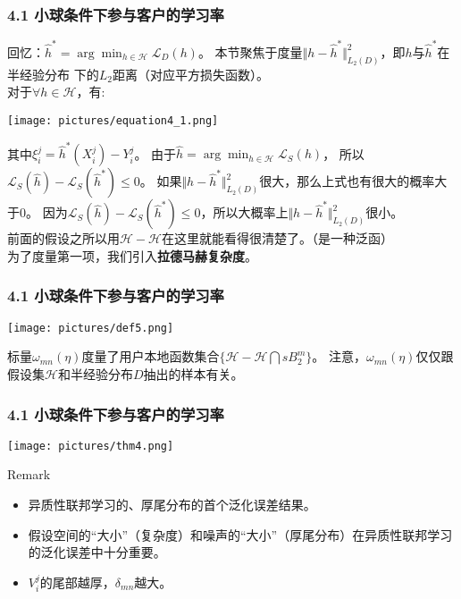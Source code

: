 \documentclass{beamer}
\begin{document}
\begin{frame}
    \frametitle{4.1 小球条件下参与客户的学习率}
    回忆：$\hat{h}^{*} = \arg\min_{h\in \mathcal{H}}\mathcal{L}_{D}(h) $。
    本节聚焦于度量$\Vert h - \hat{h}^{*} \Vert_{L_{2}(D)}^{2}$，即$h$与$\hat{h}^{*}$在半经验分布
    下的$L_{2}$距离（对应平方损失函数）。\\
    \pause
    对于$\forall h \in \mathcal{H}$，有:
    \begin{center}
        \texttt{[image: pictures/equation4\_1.png]}
    \end{center}
    其中$\xi_{i}^{j} = \hat{h}^{*}(X_{i}^{j})-Y_{i}^{j} $。
    \pause
    由于$\hat{h} = \arg\min_{h\in \mathcal{H}}\mathcal{L}_{S}(h)$，
    所以$\mathcal{L}_{S}(\hat{h}) - \mathcal{L}_{S}(\hat{h}^{*})\leq 0$。
    如果$\Vert h - \hat{h}^{*} \Vert_{L_{2}(D)}^{2}$很大，那么上式也有很大的概率大于0。
    因为$\mathcal{L}_{S}(\hat{h}) - \mathcal{L}_{S}(\hat{h}^{*})\leq 0$，所以大概率上$\Vert \hat{h} - \hat{h}^{*} \Vert_{L_{2}(D)}^{2}$很小。\\
    前面的假设之所以用$\mathcal{H}-\mathcal{H}$在这里就能看得很清楚了。（是一种泛函）\\
    \pause
    为了度量第一项，我们引入\textbf{拉德马赫复杂度}。
\end{frame}

\begin{frame}
    \frametitle{4.1 小球条件下参与客户的学习率}
    \begin{definition}[拉德马赫复杂度]
        \begin{center}
            \texttt{[image: pictures/def5.png]}
        \end{center}
    \end{definition}
    \pause

    标量$\omega_{mn}(\eta)$度量了用户本地函数集合$\{\mathcal{H}- \mathcal{H}\bigcap sB_{2}^{m}\}$。
    注意，$\omega_{mn}(\eta)$仅仅跟假设集$\mathcal{H}$和半经验分布$D$抽出的样本有关。

\end{frame}

\begin{frame}
    \frametitle{4.1 小球条件下参与客户的学习率}
    \begin{center}
        \texttt{[image: pictures/thm4.png]}
    \end{center}
    \pause
    \begin{alertblock}{Remark}
        \begin{itemize}
            \item 异质性联邦学习的、厚尾分布的首个泛化误差结果。
            \pause
            \item 假设空间的“大小”（复杂度）和噪声的“大小”（厚尾分布）在异质性联邦学习的泛化误差中十分重要。
            \pause
            \item $V_{i}^{j}$的尾部越厚，$\delta_{mn}$越大。
        \end{itemize}
    \end{alertblock}
\end{frame}
\end{document}
